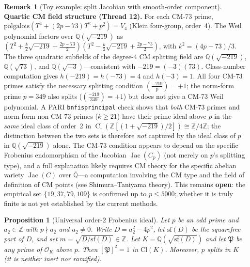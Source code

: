 \documentclass[11pt,a4paper]{article}
\newtheorem{proposition}[theorem]{Proposition}
\theoremstyle{definition}
\newtheorem{remark}[theorem]{Remark}
\newcommand{\ZZ}{\mathbb{Z}}
\newcommand{\QQ}{\mathbb{Q}}
\newcommand{\Cl}{\operatorname{Cl}}
\newcommand{\Jac}{\operatorname{Jac}}
\begin{document}
\begin{remark}[Toy example: split Jacobian with smooth-order component]
\medskip
\noindent\textbf{Quartic CM field structure (Thread 12).}
For each CM-73 prime, $\mathrm{polgalois}(T^4 + (2p{-}73)T^2 + p^2) = V_4$
(Klein four-group, order~4).  The Weil polynomial factors over $\QQ(\sqrt{-219})$
as $(T^2 + \tfrac{k}{2}\sqrt{-219} + \tfrac{2p{-}73}{2})(T^2 - \tfrac{k}{2}\sqrt{-219} + \tfrac{2p{-}73}{2})$,
with $k^2 = (4p-73)/3$.  The three quadratic subfields of the degree-4 CM splitting
field are $\QQ(\sqrt{-219})$, $\QQ(\sqrt{73})$, and $\QQ(\sqrt{-3})$---consistent
with $-219 = (-3)(73)$.  Class-number computation gives $h(-219) = h(-73) = 4$
and $h(-3) = 1$.  All four CM-73 primes satisfy the necessary splitting condition
$\left(\frac{-219}{p}\right) = +1$; the norm-form prime $p = 349$ also splits
($\left(\frac{-219}{349}\right) = +1$) but does not give a CM-73 Weil polynomial.
A PARI \texttt{bnfisprincipal} check shows that \emph{both} CM-73 primes
and norm-form non-CM-73 primes ($k \ge 21$) have their prime ideal above $p$
in the \emph{same} ideal class of order~2 in $\Cl(\ZZ[(1+\sqrt{-219})/2]) \cong \ZZ/4\ZZ$;
the distinction between the two sets is therefore \emph{not} captured by the
ideal class of $p$ in $\QQ(\sqrt{-219})$ alone.
The CM-73 condition appears to depend on the specific Frobenius endomorphism
of the Jacobian $\Jac(C_{p})$ (not merely on $p$'s splitting type), and a full
explanation likely requires CM theory for the specific abelian variety $\Jac(C)$
over $\overline{\QQ}$---a computation involving the CM type and the field of
definition of CM points (see Shimura--Taniyama theory).
This remains \textbf{open}: the empirical set $\{19,37,79,109\}$ is confirmed up to
$p \le 5000$; whether it is truly finite is not yet established by the current methods.
\end{remark}

\begin{proposition}[Universal order-$2$ Frobenius ideal]\label{prop:biquadratic-order2}
Let $p$ be an odd prime and $a_2 \in \ZZ$ with $p \nmid a_2$ and $a_2 \neq 0$.
Write $D = a_2^2 - 4p^2$, let $\mathrm{sf}(D)$ be the squarefree part of $D$,
and set $m = \sqrt{D / \mathrm{sf}(D)} \in \ZZ$.
Let $K = \QQ(\sqrt{\mathrm{sf}(D)})$ and let $\mathfrak{P}$ be any prime of $\mathcal{O}_K$
above $p$.  Then $[\mathfrak{P}]^2 = 1$ in $\mathrm{Cl}(K)$.
Moreover, $p$ \emph{splits} in $K$ (it is neither inert nor ramified).
\end{proposition}
\end{document}
